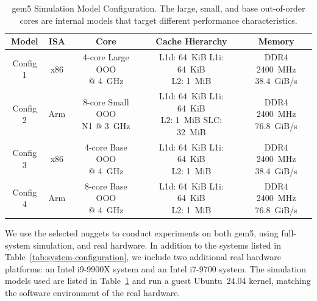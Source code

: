 \begin{table}[!t]
  \centering
  \scriptsize  %
  \setlength{\tabcolsep}{3pt}
  \renewcommand{\arraystretch}{1.2}

  \begin{tabular}{|c|c|c|c|c|}
    \hline
    \textbf{Model}
      & \textbf{ISA}
      & \textbf{Core}
      & \textbf{Cache Hierarchy}
      & \textbf{Memory} \\ \hline

    Config 1
      & x86
      & \makecell[l]{4-core Large OOO\\@ 4~GHz}
      & \makecell[l]{L1d: 64~KiB L1i: 64~KiB\\L2: 1~MiB}
      & \makecell[l]{DDR4 2400~MHz\\38.4~GiB/s} \\ \hline

    Config 2
      & Arm
      & \makecell[l]{8-core Small OOO\\N1 @ 3~GHz}
      & \makecell[l]{L1d: 64~KiB L1i: 64~KiB\\L2: 1~MiB SLC: 32~MiB}
      & \makecell[l]{DDR4 2400~MHz\\76.8~GiB/s} \\ \hline

    Config 3
      & x86
      & \makecell[l]{4-core Base OOO\\@ 4~GHz}
      & \makecell[l]{L1d: 64~KiB L1i: 64~KiB\\L2: 1~MiB}
      & \makecell[l]{DDR4 2400~MHz\\38.4~GiB/s} \\ \hline

    Config 4
      & Arm
      & \makecell[l]{8-core Base OOO\\@ 4~GHz}
      & \makecell[l]{L1d: 64~KiB L1i: 64~KiB\\L2: 1~MiB}
      & \makecell[l]{DDR4 2400~MHz\\76.8~GiB/s} \\ \hline

  \end{tabular}

  \caption{gem5 Simulation Model Configuration. The large, small, and base out-of-order cores are internal models that target different performance characteristics.}
  \label{tab:system-configuration-simulation}
\end{table}


We use the selected nuggets to conduct experiments on both gem5, using full-system simulation, and real hardware.
In addition to the systems listed in Table~\ref{tab:system-configuration}, we include two additional real hardware platforms: an Intel i9-9900X system and an Intel i7-9700 system.
The simulation models used are listed in Table~\ref{tab:system-configuration-simulation} and run a guest Ubuntu~24.04 kernel, matching the software environment of the real hardware.

